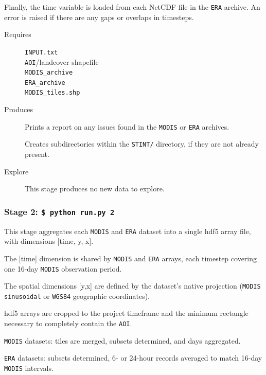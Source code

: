 \documentclass[twoside,a4paper]{refart}
\begin{document}
Finally, the time variable is loaded from each NetCDF file in the 
\texttt{ERA} archive.  An error is raised if there are any gaps 
or overlaps in timesteps.


  \begin{description}
    \item [Requires]
          \texttt{INPUT.txt} \\
          \texttt{AOI}/landcover shapefile \\
          \texttt{MODIS\_archive} \\
          \texttt{ERA\_archive} \\
          \texttt{MODIS\_tiles.shp}
      
  
  
    \item [Produces]
      Prints a report on any issues found in the 
      \texttt{MODIS} or \texttt{ERA} archives.
      
      Creates subdirectories within the \texttt{STINT/} directory, 
      if they are not already present.
      

    \item [Explore]
      This stage produces no new data to explore.
  \end{description}
  
\subsubsection{\textbf{Stage 2:} \texttt{\$ python run.py 2}}
This stage aggregates each \texttt{MODIS} and \texttt{ERA} dataset into
a single hdf5 array file, with dimensions [time, y, x].

The [time] dimension is shared by \texttt{MODIS} and \texttt{ERA} arrays, each timestep covering one 16-day \texttt{MODIS} observation period.

The spatial dimensions [y,x] are defined by the dataset's 
native projection (\texttt{MODIS sinusoidal} or \texttt{WGS84} geographic coordinates).
        
hdf5 arrays are cropped to the project timeframe and the minimum 
rectangle necessary to completely contain the \texttt{AOI}.


\texttt{MODIS} datasets: tiles are merged, subsets determined, and days aggregated.

\texttt{ERA} datasets: subsets determined, 6- or 24-hour records averaged to match 16-day \texttt{MODIS} intervals.
\end{document}

